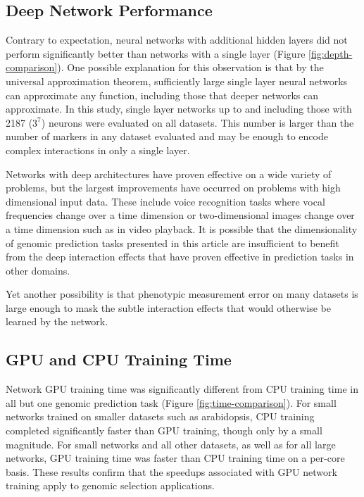 \ifdefined\showtablesandfigures
\fi

\subsection*{Deep Network Performance}

Contrary to expectation, neural networks with additional hidden layers did not perform
significantly better than networks with a single layer (Figure \ref{fig:depth-comparison}). 
One possible explanation for this observation is that by the universal approximation theorem,
sufficiently large single layer neural networks can approximate any function, including those
that deeper networks can approximate. In this study, single layer networks up to and including
those with 2187 ($3^7$) neurons were evaluated on all datasets. This number is larger than the number
of markers in any dataset evaluated and may be enough to encode complex interactions in only a single
layer.

Networks with deep architectures have proven effective on a wide variety of problems, but the largest
improvements have occurred on problems with high dimensional input data. These include voice recognition 
tasks where vocal frequencies change over a time dimension or two-dimensional images change over 
a time dimension such as in video playback. It is possible that the dimensionality of genomic 
prediction tasks presented in this article are insufficient to benefit from the deep interaction 
effects that have proven effective in prediction tasks in other domains. 

Yet another possibility is that phenotypic measurement error on many datasets is large enough 
to mask the subtle interaction effects that would otherwise be learned by the network.

\ifdefined\showtablesandfigures
\fi

\subsection*{GPU and CPU Training Time}

Network GPU training time was significantly different from CPU training time in all but
one genomic prediction task (Figure \ref{fig:time-comparison}). For small networks 
trained on smaller datasets such as arabidopsis, CPU training completed significantly 
faster than GPU training, though only by a small magnitude. For small networks and 
all other datasets, as well as for all large networks, GPU training time was faster 
than CPU training time on a per-core basis. These results confirm that the speedups 
associated with GPU network training apply to genomic selection applications.

